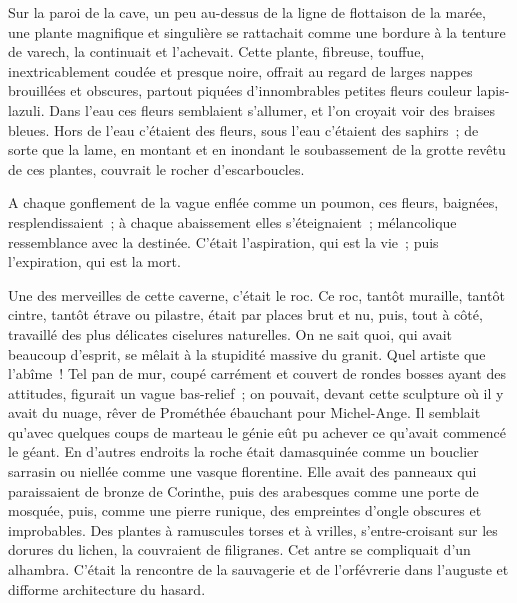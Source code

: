 \documentclass[french,twoside]{book} %
\begin{document}
Sur la paroi de la cave, un peu au-dessus de la ligne de flottaison de la marée, une plante magnifique et singulière se rattachait comme une bordure à la tenture de varech, la continuait et l’achevait. Cette plante, fibreuse, touffue, inextricablement coudée et presque noire, offrait au regard de larges nappes brouillées et obscures, partout piquées d’innombrables petites fleurs couleur lapis-lazuli. Dans l’eau ces fleurs semblaient s’allumer, et l’on croyait voir des braises bleues. Hors de l’eau c’étaient des fleurs, sous l’eau c’étaient des saphirs ; de sorte que la lame, en montant et en inondant le soubassement de la grotte revêtu de ces plantes, couvrait le rocher d’escarboucles.\par
A chaque gonflement de la vague enflée comme un poumon, ces fleurs, baignées, resplendissaient ; à chaque abaissement elles s’éteignaient ; mélancolique ressemblance avec la destinée. C’était l’aspiration, qui est la vie ; puis l’expiration, qui est la mort.\par
Une des merveilles de cette caverne, c’était le roc. Ce roc, tantôt muraille, tantôt cintre, tantôt étrave ou pilastre, était par places brut et nu, puis, tout à côté, travaillé des plus délicates ciselures naturelles. On ne sait quoi, qui avait beaucoup d’esprit, se mêlait à la  stupidité massive du granit. Quel artiste que l’abîme ! Tel pan de mur, coupé carrément et couvert de rondes bosses ayant des attitudes, figurait un vague bas-relief ; on pouvait, devant cette sculpture où il y avait du nuage, rêver de Prométhée ébauchant pour Michel-Ange. Il semblait qu’avec quelques coups de marteau le génie eût pu achever ce qu’avait commencé le géant. En d’autres endroits la roche était damasquinée comme un bouclier sarrasin ou niellée comme une vasque florentine. Elle avait des panneaux qui paraissaient de bronze de Corinthe, puis des arabesques comme une porte de mosquée, puis, comme une pierre runique, des empreintes d’ongle obscures et improbables. Des plantes à ramuscules torses et à vrilles, s’entre-croisant sur les dorures du lichen, la couvraient de filigranes. Cet antre se compliquait d’un alhambra. C’était la rencontre de la sauvagerie et de l’orfévrerie dans l’auguste et difforme architecture du hasard.\par
\end{document}
